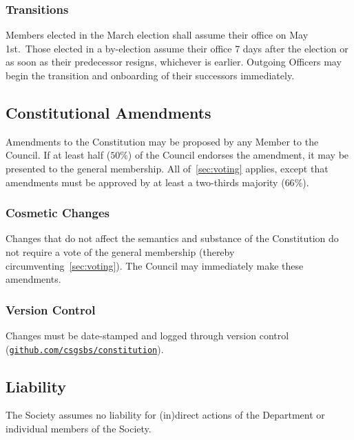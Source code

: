 \subsubsection{Transitions}
Members elected in the March election shall assume their office on May 1st.\
Those elected in a by-election assume their office 7 days after the election or
as soon as their predecessor resigns, whichever is earlier. Outgoing Officers
may begin the transition and onboarding of their successors immediately.

\subsection{Constitutional Amendments}
Amendments to the Constitution may be proposed by any Member to the Council. If
at least half ($50\%$) of the Council endorses the amendment, it may be
presented to the general membership. All of~\ref{sec:voting} applies, except
that amendments must be approved by at least a two-thirds majority ($66\%$).

\subsubsection{Cosmetic Changes}
Changes that do not affect the semantics and substance of the Constitution do
not require a vote of the general membership (thereby
circumventing~\ref{sec:voting}). The Council may immediately make these
amendments.

\subsubsection{Version Control}
Changes must be date-stamped and logged through version control
(\href{https://github.com/csgsbs/constitution}{\texttt{github.com/csgsbs/constitution}}).

\subsection{Liability}
The Society assumes no liability for (in)direct actions of the Department or
individual members of the Society.